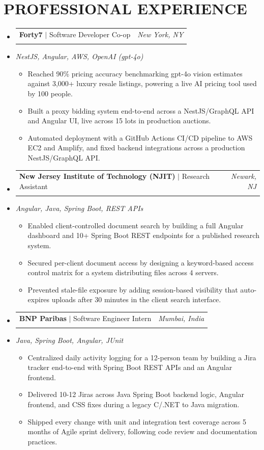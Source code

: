 \documentclass[letterpaper,11pt]{article}
\makeatletter
\newcommand{\resumeItem}[1]{
  \item\small{#1\vspace{-3pt}}
}
\newcommand{\resumeStack}[1]{
  \vspace{1pt}\item\small{\textit{#1}}\vspace{-6pt}
}
\newcommand{\resumeExpHeading}[4]{
  \vspace{-3pt}\item
    \begin{tabular*}{1.0\textwidth}[t]{l@{\extracolsep{\fill}}r}
      \textbf{\large #1} $|$ #2 & \textit{\large #3} \\
       & \text{\small #4} \\
    \end{tabular*}\vspace{-9pt}
}
\newcommand{\resumeItemListStart}{\begin{itemize}[leftmargin=0.15in, label=$\bullet$]}
\newcommand{\resumeItemListEnd}{\end{itemize}\vspace{-7pt}}
\newcommand{\resumeSubHeadingListStart}{\begin{itemize}[leftmargin=0.0in, label={}]}
\newcommand{\resumeSubHeadingListEnd}{\end{itemize}}
\makeatother
\begin{document}
\section{PROFESSIONAL EXPERIENCE}
\resumeSubHeadingListStart
\vspace{10pt}
\resumeExpHeading
{Forty7}{Software Developer Co-op}{New York, NY}{Jan 2026 -- May 2026}
\vspace{-13pt}
\resumeStack{NestJS, Angular, AWS, OpenAI (gpt-4o)}
\resumeItemListStart
  \resumeItem{Reached 90\% pricing accuracy benchmarking gpt-4o vision estimates against 3,000+ luxury resale listings, powering a live AI pricing tool used by 100 people.}
  \resumeItem{Built a proxy bidding system end-to-end across a NestJS/GraphQL API and Angular UI, live across 15 lots in production auctions.}
  \resumeItem{Automated deployment with a GitHub Actions CI/CD pipeline to AWS EC2 and Amplify, and fixed backend integrations across a production NestJS/GraphQL API.}
\resumeItemListEnd
\vspace{10pt}
\resumeExpHeading
{New Jersey Institute of Technology (NJIT)}{Research Assistant}{Newark, NJ}{Apr 2025 -- Sep 2025}
\vspace{-13pt}
\resumeStack{Angular, Java, Spring Boot, REST APIs}
\resumeItemListStart
  \resumeItem{Enabled client-controlled document search by building a full Angular dashboard and 10+ Spring Boot REST endpoints for a published research system.}
  \resumeItem{Secured per-client document access by designing a keyword-based access control matrix for a system distributing files across 4 servers.}
  \resumeItem{Prevented stale-file exposure by adding session-based visibility that auto-expires uploads after 30 minutes in the client search interface.}
\resumeItemListEnd
\vspace{10pt}
\resumeExpHeading
{BNP Paribas}{Software Engineer Intern}{Mumbai, India}{Jan 2024 -- Jul 2024}
\vspace{-13pt}
\resumeStack{Java, Spring Boot, Angular, JUnit}
\resumeItemListStart
  \resumeItem{Centralized daily activity logging for a 12-person team by building a Jira tracker end-to-end with Spring Boot REST APIs and an Angular frontend.}
  \resumeItem{Delivered 10-12 Jiras across Java Spring Boot backend logic, Angular frontend, and CSS fixes during a legacy C/.NET to Java migration.}
  \resumeItem{Shipped every change with unit and integration test coverage across 5 months of Agile sprint delivery, following code review and documentation practices.}
\resumeItemListEnd

\resumeSubHeadingListEnd
\end{document}

